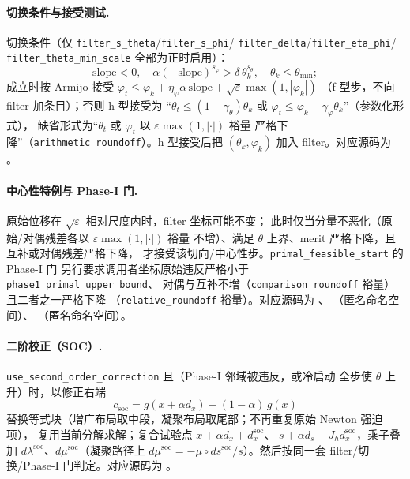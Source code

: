 \paragraph{切换条件与接受测试.}
切换条件（仅 \texttt{filter\_s\_theta}/\texttt{filter\_s\_phi}/
\texttt{filter\_delta}/\texttt{filter\_eta\_phi}/
\texttt{filter\_theta\_min\_scale} 全部为正时启用）：
\begin{equation}
  \mathrm{slope} < 0,\quad
  \alpha (-\mathrm{slope})^{s_\varphi} >
  \delta\, \theta_k^{s_\theta},\quad
  \theta_k \le \theta_{\min};
  \label{eq:ipm:switching}
\end{equation}
成立时按 Armijo 接受 $\varphi_t \le \varphi_k +
\eta_\varphi \alpha\, \mathrm{slope} + \sqrt{\varepsilon}\max(1,|\varphi_k|)$
（f 型步，不向 filter 加条目）；否则 h 型接受为
``$\theta_t \le (1-\gamma_\theta)\theta_k$ 或
$\varphi_t \le \varphi_k - \gamma_\varphi \theta_k$''（参数化形式），
缺省形式为``$\theta_t$ 或 $\varphi_t$ 以 $\varepsilon\max(1,|\cdot|)$ 裕量
严格下降''（\texttt{arithmetic\_roundoff}）。h 型接受后把
$(\theta_k, \varphi_k)$ 加入 filter。对应源码为
。

\paragraph{中心性特例与 Phase-I 门.}
原始位移在 $\sqrt{\varepsilon}$ 相对尺度内时，filter 坐标可能不变；
此时仅当分量不恶化（原始/对偶残差各以 $\varepsilon\max(1,|\cdot|)$ 裕量
不增）、满足 $\theta$ 上界、merit 严格下降，且互补或对偶残差严格下降，
才接受该切向/中心性步。\texttt{primal\_feasible\_start} 的 Phase-I 门
另行要求调用者坐标原始违反严格小于 \texttt{phase1\_primal\_upper\_bound}、
对偶与互补不增（\texttt{comparison\_roundoff} 裕量）且二者之一严格下降
（\texttt{relative\_roundoff} 裕量）。对应源码为
、
（匿名命名空间）、
（匿名命名空间）。

\paragraph{二阶校正（SOC）.}
\texttt{use\_second\_order\_correction} 且（Phase-I 邻域被违反，或冷启动
全步使 $\theta$ 上升）时，以修正右端
\begin{equation}
  c_{\text{soc}} = g(x + \alpha d_x) - (1-\alpha)\, g(x)
  \label{eq:ipm:soc}
\end{equation}
替换等式块（增广布局取中段，凝聚布局取尾部；不再重复原始 Newton 强迫项），
复用当前分解求解；复合试验点 $x + \alpha d_x + d_x^{\text{soc}}$、
$s + \alpha d_s - J_h d_x^{\text{soc}}$，乘子叠加
$d\lambda^{\text{soc}}$、$d\mu^{\text{soc}}$（凝聚路径上
$d\mu^{\text{soc}} = -\mu \circ d s^{\text{soc}} / s$）。然后按同一套
filter/切换/Phase-I 门判定。对应源码为
。

